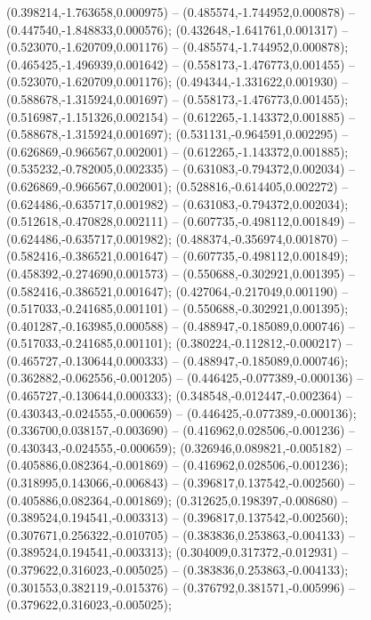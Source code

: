  (0.398214,-1.763658,0.000975) -- (0.485574,-1.744952,0.000878) -- (0.447540,-1.848833,0.000576);
 (0.432648,-1.641761,0.001317) -- (0.523070,-1.620709,0.001176) -- (0.485574,-1.744952,0.000878);
 (0.465425,-1.496939,0.001642) -- (0.558173,-1.476773,0.001455) -- (0.523070,-1.620709,0.001176);
 (0.494344,-1.331622,0.001930) -- (0.588678,-1.315924,0.001697) -- (0.558173,-1.476773,0.001455);
 (0.516987,-1.151326,0.002154) -- (0.612265,-1.143372,0.001885) -- (0.588678,-1.315924,0.001697);
 (0.531131,-0.964591,0.002295) -- (0.626869,-0.966567,0.002001) -- (0.612265,-1.143372,0.001885);
 (0.535232,-0.782005,0.002335) -- (0.631083,-0.794372,0.002034) -- (0.626869,-0.966567,0.002001);
 (0.528816,-0.614405,0.002272) -- (0.624486,-0.635717,0.001982) -- (0.631083,-0.794372,0.002034);
 (0.512618,-0.470828,0.002111) -- (0.607735,-0.498112,0.001849) -- (0.624486,-0.635717,0.001982);
 (0.488374,-0.356974,0.001870) -- (0.582416,-0.386521,0.001647) -- (0.607735,-0.498112,0.001849);
 (0.458392,-0.274690,0.001573) -- (0.550688,-0.302921,0.001395) -- (0.582416,-0.386521,0.001647);
 (0.427064,-0.217049,0.001190) -- (0.517033,-0.241685,0.001101) -- (0.550688,-0.302921,0.001395);
 (0.401287,-0.163985,0.000588) -- (0.488947,-0.185089,0.000746) -- (0.517033,-0.241685,0.001101);
 (0.380224,-0.112812,-0.000217) -- (0.465727,-0.130644,0.000333) -- (0.488947,-0.185089,0.000746);
 (0.362882,-0.062556,-0.001205) -- (0.446425,-0.077389,-0.000136) -- (0.465727,-0.130644,0.000333);
 (0.348548,-0.012447,-0.002364) -- (0.430343,-0.024555,-0.000659) -- (0.446425,-0.077389,-0.000136);
 (0.336700,0.038157,-0.003690) -- (0.416962,0.028506,-0.001236) -- (0.430343,-0.024555,-0.000659);
 (0.326946,0.089821,-0.005182) -- (0.405886,0.082364,-0.001869) -- (0.416962,0.028506,-0.001236);
 (0.318995,0.143066,-0.006843) -- (0.396817,0.137542,-0.002560) -- (0.405886,0.082364,-0.001869);
 (0.312625,0.198397,-0.008680) -- (0.389524,0.194541,-0.003313) -- (0.396817,0.137542,-0.002560);
 (0.307671,0.256322,-0.010705) -- (0.383836,0.253863,-0.004133) -- (0.389524,0.194541,-0.003313);
 (0.304009,0.317372,-0.012931) -- (0.379622,0.316023,-0.005025) -- (0.383836,0.253863,-0.004133);
 (0.301553,0.382119,-0.015376) -- (0.376792,0.381571,-0.005996) -- (0.379622,0.316023,-0.005025);
